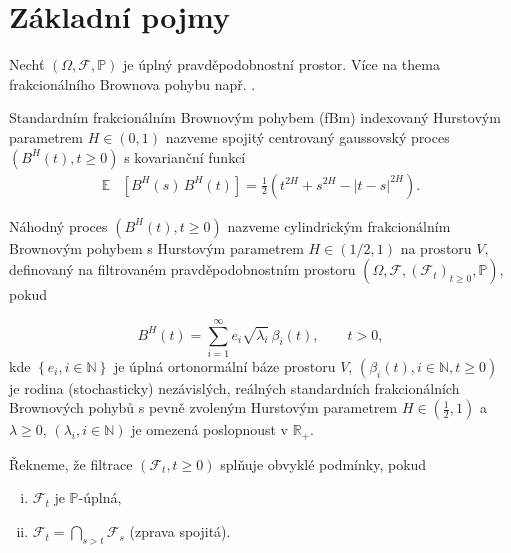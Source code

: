 
\chapter{Základní pojmy}

Nechť $\left( \Omega, \mathcal{F}, \mathbb{P} \right)$ je úplný
pravděpodobnostní prostor. Více na thema frakcionálního Brownova pohybu např.
\cite{nourdin2013selected}.


\begin{definice}\label{def:fbm}
    Standardním frakcionálním Brownovým pohybem (\vspace{2pt}fBm) indexovaný
    Hurstovým parametrem $H\in\left(0,1\right)$ nazveme spojitý centrovaný
    gaussovský proces $\left( B^H (t),t\geq 0\right)$ s kovarianční funkcí
    \begin{align*}
      \mathbb{E}& \left[ B^H (s) \, B^H (t) \right] =
      \frac{1}{2}\left( t^{2H}+s^{2H}-|t-s|^{2H} \right).
    \end{align*}
\end{definice}


\begin{definice}
    Náhodný proces $\left(B^H(t),t\geq0\right)$ nazveme cylindrickým frakcionálním Brownovým
    pohybem s Hurstovým parametrem $H\in\left(1/2,1\right)$ na prostoru $V$, definovaný na
    filtrovaném pravděpodobnostním prostoru $\left( \Omega, \mathscr{F}, \left(
    \mathscr{F}_t\right)_{t\geq0},\mathbb{P} \right)$, pokud
    
    $$ B^H(t) = \sum_{i=1}^\infty e_i \sqrt{\lambda_i}\, \beta_i (t), \qquad
    t>0,$$
    kde $\left\{ e_i, i\in\mathbb{N} \right\}$ je úplná ortonormální báze
    prostoru $V$, $\left( \beta_i(t),i\in\mathbb{N},t\geq0 \right)$ je rodina
    (stochasticky) nezávislých, reálných standardních frakcionálních
    Brownových pohybů s pevně zvoleným Hurstovým parametrem $H\in\left(
    {\frac{1}{2},1}\right)$ a $\lambda\geq0$, $\left(
    \lambda_i,i\in\mathbb{N} \right)$ je omezená poslopnoust v
    $\mathbb{R}_+$.
\end{definice}


\begin{definice}
    Řekneme, že filtrace $\left( \mathscr{F}_t,t\geq0 \right)$ splňuje obvyklé podmínky, pokud
    \begin{enumerate}[(i)]
        \item $\mathscr{F}_t$ je $\mathbb{P}$-úplná,
        \item $\mathscr{F}_t = \bigcap_{s>t} \mathscr{F}_s$  (zprava spojitá).
    \end{enumerate}
\end{definice}


